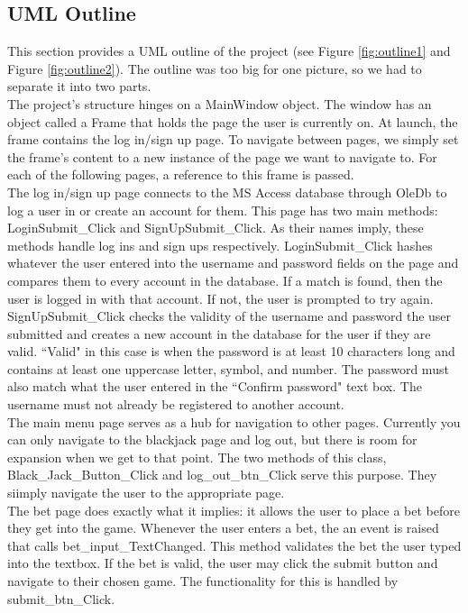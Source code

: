 \documentclass[10pt,conference,onecolumn,compsoc]{IEEEtran}
\begin{document}
\subsection{UML Outline}
\noindent
This section provides a UML outline of the project (see Figure \ref{fig:outline1} and Figure \ref{fig:outline2}). The outline was too big for one picture, so we had to separate it into two parts.\\
\newline
The project's structure hinges on a MainWindow object. The window has an object called a Frame that holds the page the user is currently on. At launch, the frame contains the log in/sign up page. To navigate between pages, we simply set the frame's content to a new instance of the page we want to navigate to. For each of the following pages, a reference to this frame is passed.\\
\newline
The log in/sign up page connects to the MS Access database through OleDb to log a user in or create an account for them. This page has two main methods: LoginSubmit\_Click and SignUpSubmit\_Click. As their names imply, these methods handle log ins and sign ups respectively.  LoginSubmit\_Click hashes whatever the user entered into the username and password fields on the page and compares them to every account in the database. If a match is found, then the user is logged in with that account. If not, the user is prompted to try again. SignUpSubmit\_Click
checks the validity of the username and password the user submitted and creates a new account in the database for the user if they are valid. ``Valid" in this case is when the password is at least 10 characters long and contains at least one uppercase letter, symbol, and number. The password must also match what the user entered in the ``Confirm password" text box. The username must not already be registered to another account.\\
\newline
The main menu page serves as a hub for navigation to other pages. Currently you can only navigate to the blackjack page and log out, but there is room for expansion when we get to that point. The two methods of this class, Black\_Jack\_Button\_Click and log\_out\_btn\_Click serve this purpose. They siimply navigate the user to the appropriate page.\\
\newline
The bet page does exactly what it implies: it allows the user to place a bet before they get into the game. Whenever the user enters a bet, the an event is raised that calls bet\_input\_TextChanged. This method validates the bet the user typed into the textbox. If the bet is valid, the user may click the submit button and navigate to their chosen game. The functionality for this is handled by submit\_btn\_Click.\\
\end{document}
